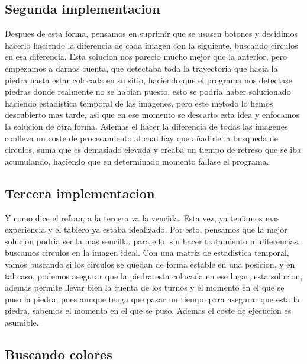 \documentclass[12pt,a4paper]{report}
\begin{document}
\subsection{Segunda implementacion}

Despues de esta forma, pensamos en suprimir que se usasen botones y decidimos hacerlo haciendo la diferencia de cada imagen con la siguiente, buscando circulos en esa diferencia. Esta solucion nos parecio mucho mejor que la anterior, pero empezamos a darnos cuenta, que detectaba toda la trayectoria que hacia la piedra hasta estar colocada en su sitio, haciendo que el programa nos detectase piedras donde realmente no se habian puesto, esto se podria haber solucionado haciendo estadistica temporal de las imagenes, pero este metodo lo hemos descubierto mas tarde, asi que en ese momento se descarto esta idea y enfocamos la solucion de otra forma. Ademas el hacer la diferencia de todas las imagenes conlleva un coste de procesamiento al cual hay que añadirle la busqueda de circulos, suma que es demasiado elevada y creaba un tiempo de retreso que se iba acumulando, haciendo que en determinado momento fallase el programa.

\subsection{Tercera implementacion}

Y como dice el refran, a la tercera va la vencida. Esta vez, ya teniamos mas experiencia y el tablero ya estaba idealizado. Por esto, pensamos que la mejor solucion podria ser la mas sencilla, para ello, sin hacer tratamiento ni diferencias, buscamos circulos en la imagen ideal. Con una matriz de estadistica temporal, vamos buscando si los circulos se quedan de forma estable en una posicion, y en tal caso, podemos asegurar que la piedra esta colocada en ese lugar, esta solucion, ademas permite llevar bien la cuenta de los turnos y el momento en el que se puso la piedra, pues aunque tenga que pasar un tiempo para asegurar que esta la piedra, sabemos el momento en el que se puso. Ademas el coste de ejecucion es asumible.

\subsection{Buscando colores}
\end{document}
